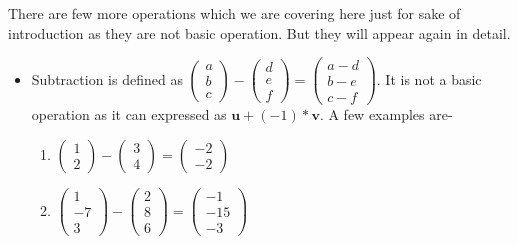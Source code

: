 \documentclass{article}
\begin{document}
There are few more operations which we are covering here just for sake of introduction as they are not basic operation. But they will appear again in detail.\\
\begin{itemize}
    \item Subtraction is defined as $\begin{pmatrix}
  a\\
  b\\
  c
 \end{pmatrix}
 -
 \begin{pmatrix}
 d\\
 e\\
 f
\end{pmatrix}
=
 \begin{pmatrix}
a-d\\
b-e\\
c-f
\end{pmatrix}$. It is not a basic operation as it can expressed as $\boldsymbol{u} + (-1)* \boldsymbol{v}$. A few examples are-
\begin{enumerate}
    \item $\begin{pmatrix}
1\\
2
\end{pmatrix}-
 \begin{pmatrix}
3\\
4
\end{pmatrix}
=
 \begin{pmatrix}
-2\\
-2
\end{pmatrix}$\\
\item  $\begin{pmatrix}
1\\
-7\\
3
\end{pmatrix}-
\begin{pmatrix}
2\\
8\\
6
\end{pmatrix}=
\begin{pmatrix}
-1\\
-15\\
-3
\end{pmatrix}$\\
\end{enumerate}



\end{itemize}
\end{document}
